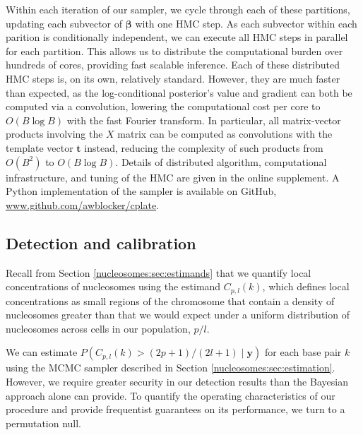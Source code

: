 Within each iteration of our sampler, we cycle through each of these partitions, updating each subvector of $\bm \beta$ with one HMC step.
As each subvector within each parition is conditionally independent, we can execute all HMC steps in parallel for each partition.
This allows us to distribute the computational burden over hundreds of cores, providing fast scalable inference.
Each of these distributed HMC steps is, on its own, relatively standard.
However, they are much faster than expected, as the log-conditional posterior's value and gradient can both be computed via a convolution, lowering the computational cost per core to $O(B \log B)$ with the fast Fourier transform. 
In particular, all matrix-vector products involving the $X$ matrix can be computed as convolutions with the template vector $\bm t$ instead, reducing the complexity of such products from $O(B^2)$ to $O(B \log B)$.
Details of distributed algorithm, computational infrastructure, and tuning of the HMC are given in the online supplement. %
A Python implementation of the sampler is available on GitHub, \url{www.github.com/awblocker/cplate}.

\subsection{Detection and calibration}
\label{nucleosomes:sec:detection}

Recall from Section \ref{nucleosomes:sec:estimands} that we quantify  local concentrations of nucleosomes using the estimand $C_{p,l}(k)$, which defines local concentrations as small regions of the chromosome that contain a density of nucleosomes greater than that we would expect under a uniform distribution of nucleosomes across cells in our population, $p / l$.

We can estimate $P(C_{p,l}(k) > (2p+1) / (2l+1) \mid \bm y)$ for each base pair $k$ using the MCMC sampler described in Section \ref{nucleosomes:sec:estimation}.
However, we require greater security in our detection results than the Bayesian approach alone can provide.
To quantify the operating characteristics of our procedure and provide frequentist guarantees on its performance, we turn to a permutation null.

